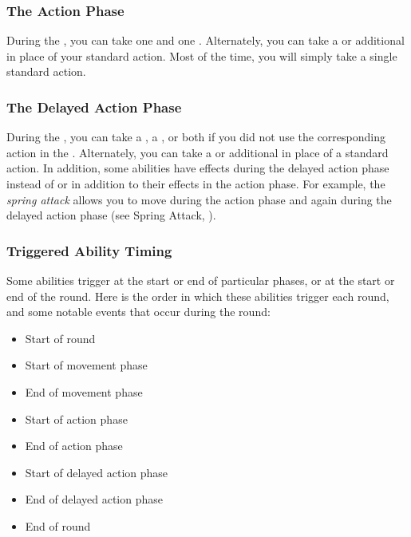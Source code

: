         \subsubsection{The Action Phase}\label{The Action Phase}
            During the , you can take one  and one .
            Alternately, you can take a  or additional  in place of your standard action.
            Most of the time, you will simply take a single standard action.

        \subsubsection{The Delayed Action Phase}\label{The Delayed Action Phase}
            During the , you can take a , a , or both if you did not use the corresponding action in the .
            Alternately, you can take a  or additional  in place of a standard action.
            In addition, some abilities have effects during the delayed action phase instead of or in addition to their effects in the action phase.
            For example, the \textit{spring attack}  allows you to move during the action phase and again during the delayed action phase (see Spring Attack, ).

        \subsubsection{Triggered Ability Timing}\label{Triggered Ability Timing}
            Some abilities trigger at the start or end of particular phases, or at the start or end of the round.
            Here is the order in which these abilities trigger each round, and some notable events that occur during the round:
            \begin{itemize}
                \item Start of round
                \item Start of movement phase
                \item End of movement phase
                \item Start of action phase
                \item End of action phase
                \item Start of delayed action phase
                \item End of delayed action phase
                \item End of round
            \end{itemize}


